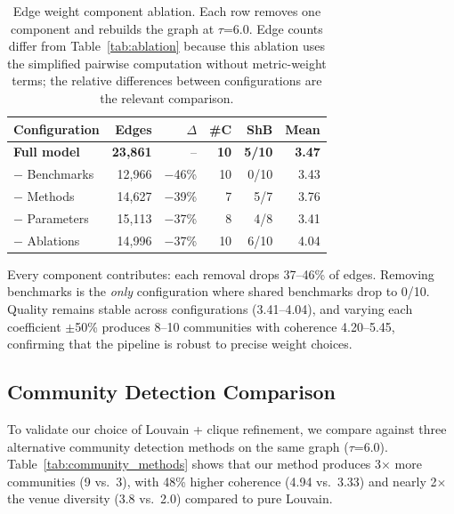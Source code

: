 \documentclass[conference]{IEEEtran}
\begin{document}
\begin{table}[t]
\caption{Edge weight component ablation. Each row removes one component and rebuilds the graph at $\tau$=6.0. Edge counts differ from Table~\ref{tab:ablation} because this ablation uses the simplified pairwise computation without metric-weight terms; the relative differences between configurations are the relevant comparison.}
\label{tab:weight_ablation}
\centering
\footnotesize
\setlength{\tabcolsep}{2.5pt}
\begin{tabular}{l|rrrrr}
\toprule
\textbf{Configuration} & \textbf{Edges} & \textbf{$\Delta$} & \textbf{\#C} & \textbf{ShB} & \textbf{Mean} \\
\midrule
\textbf{Full model} & \textbf{23{,}861} & -- & \textbf{10} & \textbf{5/10} & \textbf{3.47} \\
$-$ Benchmarks & 12{,}966 & $-$46\% & 10 & 0/10 & 3.43 \\
$-$ Methods & 14{,}627 & $-$39\% & 7 & 5/7 & 3.76 \\
$-$ Parameters & 15{,}113 & $-$37\% & 8 & 4/8 & 3.41 \\
$-$ Ablations & 14{,}996 & $-$37\% & 10 & 6/10 & 4.04 \\
\bottomrule
\end{tabular}
\end{table}

Every component contributes: each removal drops 37--46\% of edges.
Removing benchmarks is the \emph{only} configuration where shared benchmarks drop to 0/10.
Quality remains stable across configurations (3.41--4.04), and varying each coefficient $\pm$50\% produces 8--10 communities with coherence 4.20--5.45, confirming that the pipeline is robust to precise weight choices.


\subsection{Community Detection Comparison}

To validate our choice of Louvain + clique refinement, we compare against three alternative community detection methods on the same graph ($\tau$=6.0).
Table~\ref{tab:community_methods} shows that our method produces 3$\times$ more communities (9 vs.\ 3), with 48\% higher coherence (4.94 vs.\ 3.33) and nearly 2$\times$ the venue diversity (3.8 vs.\ 2.0) compared to pure Louvain.
\end{document}
